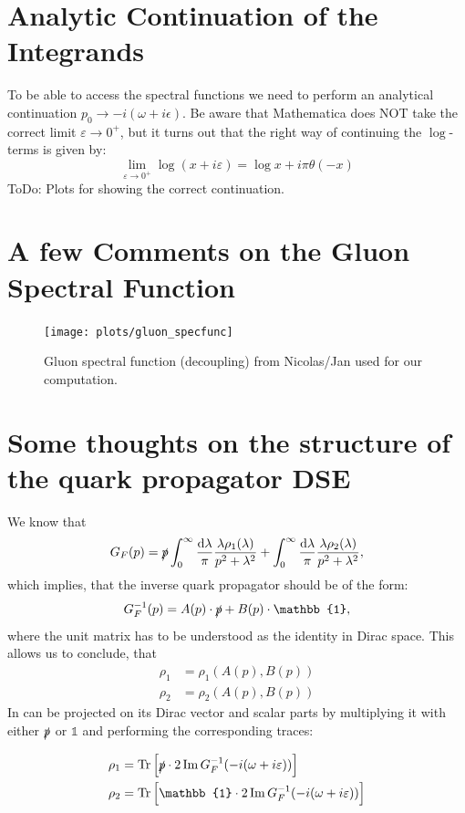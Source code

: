\documentclass[digital, %
			   openright, %
			   parskip=half,
			   11pt]{mythesis}
\begin{document}
\section*{Analytic Continuation of the Integrands}
To be able to access the spectral functions we need to perform an analytical continuation $p_{0} \rightarrow-i(\omega+i \epsilon)$. Be aware that Mathematica does NOT take the correct limit $\varepsilon\rightarrow 0^+$, but it turns out that the right way of continuing the $\operatorname{log}$-terms is given by:
\begin{equation}
	\lim _{\varepsilon \rightarrow 0^+} \log (x+i \varepsilon)=\log x+i \pi \theta(-x)
\end{equation}
\color{MScRed} ToDo: Plots for showing the correct continuation. \normalcolor
\section*{A few Comments on the Gluon Spectral Function}
\begin{figure}[H]
	\centering
	\texttt{[image: plots/gluon\_specfunc]}
	\caption{Gluon spectral function (decoupling) from Nicolas/Jan used for our computation.}
\end{figure}
\section*{Some thoughts on the structure of the quark propagator DSE}
We know that 
\begin{equation}
G_F(p) = \slashed{p} \int_{0}^{\infty} \frac{\dd \lambda}{\pi} \frac{\lambda\rho_{1}(\lambda)}{p^{2}+\lambda^2}+\int_{0}^{\infty} \frac{\dd \lambda}{\pi} \frac{\lambda\rho_{2}(\lambda)}{p^{2}+\lambda^2},
\end{equation}
which implies, that the  inverse quark propagator should be of the form:
\begin{equation}
	G_F^{-1}(p) = A(p)\cdot\slashed{p} + B(p)\cdot\mathbb{1},
\end{equation}
where the unit matrix has to be understood as the identity in Dirac space. This allows us to conclude, that
\begin{align}
\rho_1 &= \rho_1(A(p), B(p)) 	\\
\rho_2 &= \rho_2(A(p), B(p)) 
\end{align}
In can be projected on its Dirac vector and scalar parts by multiplying it with either $\slashed{p}$ or $\mathbb{1}$ and performing the corresponding traces: 

\begin{align}
\rho_1 &= \operatorname{Tr} \left[ \slashed{p}\cdot 2\Im G_F^{-1}(-i(\omega + i\varepsilon))\right]	\\
\rho_2 &= \operatorname{Tr} \left[ \mathbb{1}\cdot 2\Im G_F^{-1}(-i(\omega + i\varepsilon))\right]
\end{align}
\end{document}
